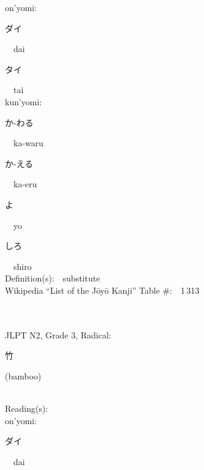 \begin{multicols}{2}
{\hspace*{1em}}on'yomi:\ \ \\
{\hspace*{2em}}{\begin{CJK}{UTF8}{min} ダイ \end{CJK}}\ \ dai\ \ \\
{\hspace*{2em}}{\begin{CJK}{UTF8}{min} タイ \end{CJK}}\ \ tai\ \ \\
{\hspace*{1em}}kun'yomi:\ \ \\
{\hspace*{2em}}{\begin{CJK}{UTF8}{min} か-わる \end{CJK}}\ \ ka-waru\ \ \\
{\hspace*{2em}}{\begin{CJK}{UTF8}{min} か-える \end{CJK}}\ \ ka-eru\ \ \\
{\hspace*{2em}}{\begin{CJK}{UTF8}{min} よ \end{CJK}}\ \ yo\ \ \\
{\hspace*{2em}}{\begin{CJK}{UTF8}{min} しろ \end{CJK}}\ \ shiro\ \ \\
Definition(s):\ \ substitute \\
Wikipedia ``List of the J\=oy\=o Kanji'' Table \#:\ \ 1\,313 \\
\ \ \\
{\fontsize{34pt}{40pt}  }\ \ \\  %
{JLPT N2, Grade 3, Radical:\ \ {\begin{CJK}{UTF8}{min} 竹 \end{CJK}} (bamboo) } \\
Reading(s):\ \ \\
{\hspace*{1em}}on'yomi:\ \ \\
{\hspace*{2em}}{\begin{CJK}{UTF8}{min} ダイ \end{CJK}}\ \ dai\ \ \\

\end{multicols}
